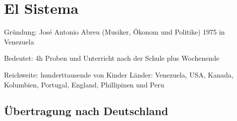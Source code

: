 \section{El Sistema}

Gründung: José Antonio Abreu (Musiker, Ökonom und Politike) 1975 in Venezuela

Bedeutet: 4h Proben und Unterricht nach der Schule plus Wochenende 

Reichweite: hunderttausende von Kinder 
Länder: Venezuela, USA, Kanada, Kolumbien, Portugal, England, Phillipinen und Peru


\subsection{Übertragung nach Deutschland}

